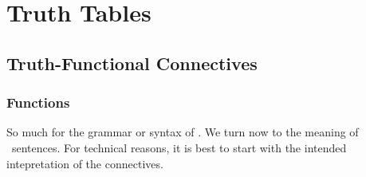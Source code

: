 \part{Truth Tables}
\label{ch.TruthTables}



\chapter{Truth-Functional Connectives}\label{s:TruthFunctionality}

\section{Functions}\label{ss.function}

So much for the grammar or syntax of \TFL. We turn now to the meaning of \TFL\ sentences. For technical reasons, it is best to  start with the intended intepretation of the connectives. 

